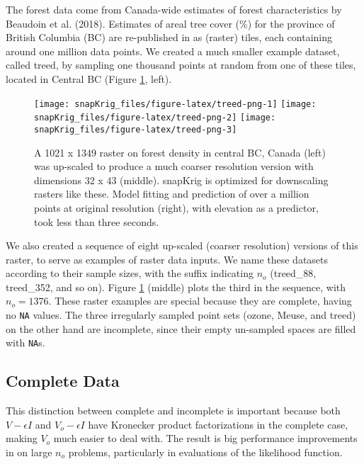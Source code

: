 The forest data come from Canada-wide estimates of forest characteristics by Beaudoin et al. (2018). Estimates of areal tree cover (\%) for the province of British Columbia (BC) are re-published in  as (raster) tiles, each containing around one million data points. We created a much smaller example dataset, called treed, by sampling one thousand points at random from one of these tiles, located in Central BC (Figure \ref{fig:treed-png}, left).

\begin{figure}[htb]
\texttt{[image: snapKrig\_files/figure-latex/treed-png-1]} \texttt{[image: snapKrig\_files/figure-latex/treed-png-2]} \texttt{[image: snapKrig\_files/figure-latex/treed-png-3]} \caption{A 1021 x 1349 raster on forest density in central BC, Canada (left) was up-scaled to produce a much coarser resolution version with dimensions 32 x 43 (middle). snapKrig is optimized for downscaling rasters like these. Model fitting and prediction of over a million points at original resolution (right), with elevation as a predictor, took less than three seconds.}\label{fig:treed-png}
\end{figure}

We also created a sequence of eight up-scaled (coarser resolution) versions of this raster, to serve as examples of raster data inputs. We name these datasets according to their sample sizes, with the suffix indicating \(n_o\) (treed\_88, treed\_352, and so on). Figure \ref{fig:treed-png} (middle) plots the third in the sequence, with \(n_o=1376\). These raster examples are special because they are complete, having no \texttt{NA} values. The three irregularly sampled point sets (ozone, Meuse, and treed) on the other hand are incomplete, since their empty un-sampled spaces are filled with \texttt{NA}s.

\hypertarget{complete-data}{%
\subsection{Complete Data}\label{complete-data}}

This distinction between complete and incomplete is important because both \(V - \epsilon I\) and \(V_o - \epsilon I\) have Kronecker product factorizations in the complete case, making \(V_o\) much easier to deal with. The result is big performance improvements in  on large \(n_o\) problems, particularly in evaluations of the likelihood function.

